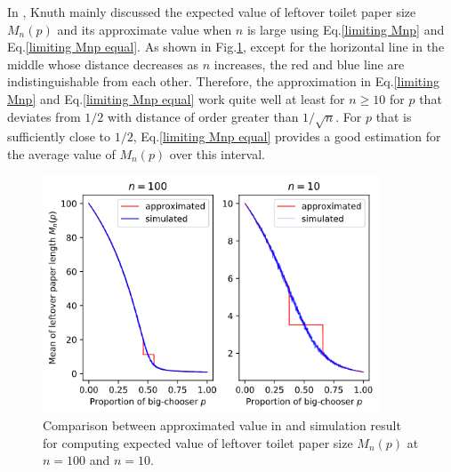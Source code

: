 \documentclass{article}
\begin{document}
In \cite{Knuth1984}, Knuth mainly discussed the expected value of leftover toilet paper size $M_n(p)$ and its approximate value when $n$ is large using Eq.\eqref{limiting Mnp} and Eq.\eqref{limiting Mnp equal}. As shown in Fig.\ref{2roll-approximation}, except for the horizontal line in the middle whose distance decreases as $n$ increases, the red and blue line are indistinguishable from each other. Therefore, the approximation in Eq.\eqref{limiting Mnp} and Eq.\eqref{limiting Mnp equal} work quite well at least for $n \geq 10$ for $p$ that deviates from $1/2$ with distance of order greater than $1/\sqrt{n}$. For $p$ that is sufficiently close to $1/2$, Eq.\eqref{limiting Mnp equal} provides a good estimation for the average value of $M_n(p)$ over this interval.
\begin{figure}[ht!]
    \centering
    \includegraphics[width=10cm]{approxim-2roll.png}
    \caption{Comparison between approximated value in \cite{Knuth1984} and simulation result for computing expected value of leftover toilet paper size $M_n(p)$ at $n=100$ and $n=10$.}
    \label{2roll-approximation}
\end{figure} 
\end{document}
